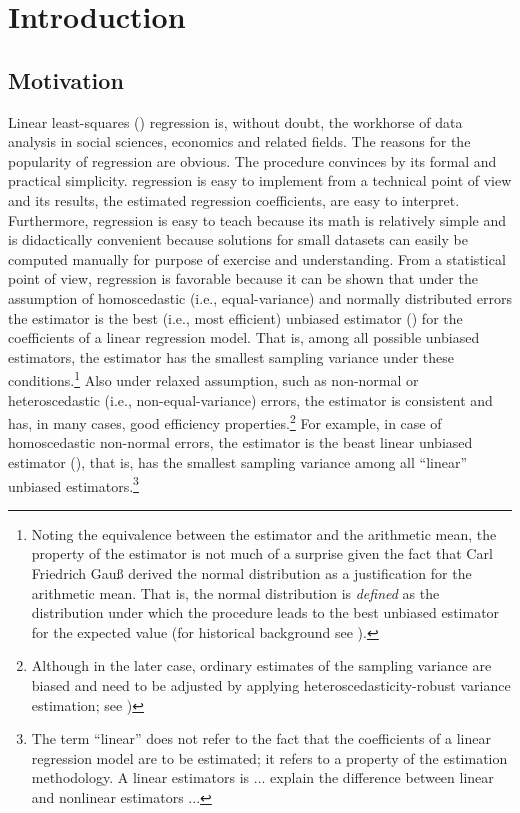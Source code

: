 \chapter{Introduction}
\label{chap:intro}

\section{Motivation}


Linear least-squares () regression is, without doubt, the workhorse of
data analysis in social sciences, economics and related fields. The reasons for
the popularity of  regression are obvious. The procedure convinces by
its formal and practical simplicity.  regression is easy to implement
from a technical point of view and its results, the estimated regression
coefficients, are easy to interpret. Furthermore,  regression is easy
to teach because its math is relatively simple and is didactically convenient
because  solutions for small datasets can easily be computed manually
for purpose of exercise and understanding. From a statistical point of view,
 regression is favorable because it can be shown that under the
assumption of homoscedastic (i.e., equal-variance) and normally distributed
errors the  estimator is the best (i.e., most efficient) unbiased
estimator () for the coefficients of a linear regression model. That
is, among all possible unbiased estimators, the  estimator has the
smallest sampling variance under these conditions.\footnote{Noting the
equivalence between the  estimator and the arithmetic mean, the
 property of the  estimator is not much of a surprise given
the fact that Carl Friedrich Gauß derived the normal distribution as a
justification for the arithmetic mean. That is, the normal distribution is
\emph{defined} as the distribution under which the  procedure leads to
the best unbiased estimator for the expected value (for historical background
see \citealp{huber72}).} Also under relaxed assumption, such as non-normal or
heteroscedastic (i.e., non-equal-variance) errors, the  estimator is
consistent and has, in many cases, good efficiency
properties.\footnote{Although in the later case, ordinary  estimates
of the sampling variance are biased and need to be adjusted by applying
heteroscedasticity-robust variance estimation; see \citealp{white80})} For
example, in case of homoscedastic non-normal errors, the  estimator is
the beast linear unbiased estimator (), that is, has the smallest
sampling variance among all “linear” unbiased estimators.\footnote{The term
“linear” does not refer to the fact that the coefficients of a linear
regression model are to be estimated; it refers to a property of the estimation
methodology. A linear estimators is \alert{... explain the difference between
linear and nonlinear estimators ...}}


